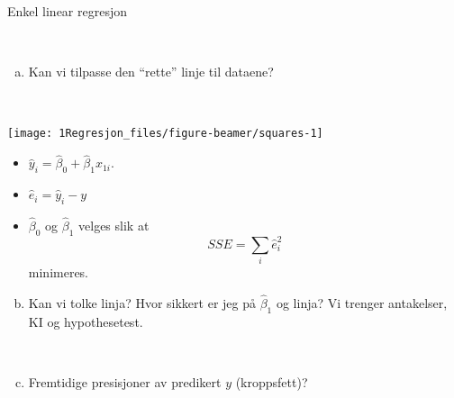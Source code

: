 \documentclass[10pt,ignorenonframetext,]{beamer}
\providecommand{\tightlist}{%
  \setlength{\itemsep}{0pt}\setlength{\parskip}{0pt}}
\begin{document}
\begin{frame}

\begin{block}{Enkel linear regresjon}

\(~\)

\begin{enumerate}
[a)]
\tightlist
\item
  Kan vi tilpasse den ``rette'' linje til dataene?
\end{enumerate}

\(~\)

\begin{center}\texttt{[image: 1Regresjon\_files/figure-beamer/squares-1]} \end{center}

\begin{itemize}
\tightlist
\item
  \(\hat{y}_i = \hat\beta_0 + \hat\beta_1x_{1i}\).
\item
  \(\hat{e}_i = \hat{y}_i - y\)
\item
  \(\hat\beta_0\) og \(\hat\beta_1\) velges slik at
  \[SSE = \sum_i \hat{e}_i^2\] minimeres.
\end{itemize}

\end{block}

\end{frame}

\begin{frame}

\begin{enumerate}
[a)]
\setcounter{enumi}{1}
\tightlist
\item
  Kan vi tolke linja? Hvor sikkert er jeg på \(\hat\beta_1\) og linja?
  Vi trenger antakelser, KI og hypothesetest.
\end{enumerate}

\(~\)

\begin{enumerate}
[a)]
\setcounter{enumi}{2}
\tightlist
\item
  Fremtidige presisjoner av predikert \(y\) (kroppsfett)?
\end{enumerate}

\(~\)

\end{frame}
\end{document}
